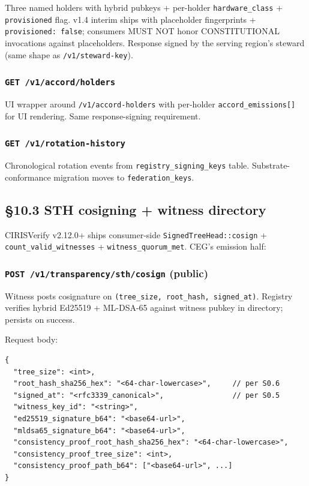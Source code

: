 \documentclass[11pt]{article}
\begin{document}
Three named holders with hybrid pubkeys + per-holder \texttt{hardware\_class} + \texttt{provisioned} flag. v1.4 interim ships with placeholder fingerprints + \texttt{provisioned: false}; consumers MUST NOT honor CONSTITUTIONAL invocations against placeholders. Response signed by the serving region's steward (same shape as \texttt{/v1/steward-key}).


\subsubsection*{\texttt{GET /v1/accord/holders}}


UI wrapper around \texttt{/v1/accord-holders} with per-holder \texttt{accord\_emissions[]} for UI rendering. Same response-signing requirement.


\subsubsection*{\texttt{GET /v1/rotation-history}}


Chronological rotation events from \texttt{registry\_signing\_keys} table. Substrate-conformance migration moves to \texttt{federation\_keys}.


\subsection*{§10.3 STH cosigning + witness directory}


CIRISVerify v2.12.0+ ships consumer-side \texttt{SignedTreeHead::cosign} + \texttt{count\_valid\_witnesses} + \texttt{witness\_quorum\_met}. CEG's emission half:


\subsubsection*{\texttt{POST /v1/transparency/sth/cosign} (public)}


Witness posts cosignature on \texttt{(tree\_size, root\_hash, signed\_at)}. Registry verifies hybrid Ed25519 + ML-DSA-65 against witness pubkey in directory; persists on success.


Request body:


\begin{lstlisting}
{
  "tree_size": <int>,
  "root_hash_sha256_hex": "<64-char-lowercase>",     // per S0.6
  "signed_at": "<rfc3339_canonical>",                // per S0.5
  "witness_key_id": "<string>",
  "ed25519_signature_b64": "<base64-url>",
  "mldsa65_signature_b64": "<base64-url>",
  "consistency_proof_root_hash_sha256_hex": "<64-char-lowercase>",
  "consistency_proof_tree_size": <int>,
  "consistency_proof_path_b64": ["<base64-url>", ...]
}
\end{lstlisting}
\end{document}

